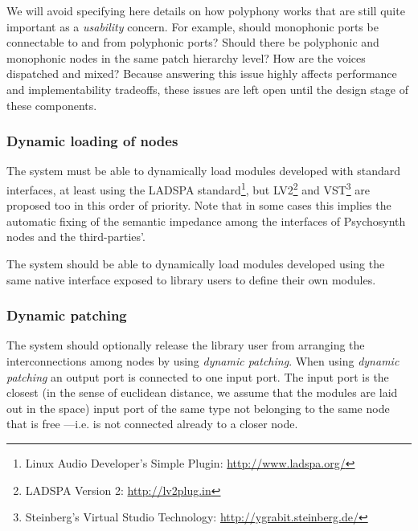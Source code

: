 \begin{mynote}
We will avoid specifying here details on how polyphony works that are
still quite important as a \emph{usability} concern. For example,
should monophonic ports be connectable to and from polyphonic ports?
Should there be polyphonic and monophonic nodes in the same patch
hierarchy level? How are the voices dispatched and mixed? Because
answering this issue highly affects performance and implementability
tradeoffs, these issues are left open until the design stage of these
components.
\end{mynote}

\subsubsection{Dynamic loading of nodes}

\begin{requirement}
  \label{req:iter3-begin}
  The system must be able to dynamically load modules developed with
  standard interfaces, at least using the LADSPA
  standard\footnote{Linux Audio Developer's Simple Plugin:
    \url{http://www.ladspa.org/}}, but LV2\footnote{LADSPA Version 2:
    \url{http://lv2plug.in}} and VST\footnote{Steinberg's Virtual
    Studio Technology: \url{http://ygrabit.steinberg.de/}} are
  proposed too in this order of priority. Note that in some cases this
  implies the automatic fixing of the semantic impedance among the
  interfaces of Psychosynth nodes and the third-parties'.
\end{requirement}

\begin{requirement}
  The system should be able to dynamically load modules developed
  using the same native interface exposed to library users to define
  their own modules. 
\end{requirement}

\subsubsection{Dynamic patching}

\begin{requirement}
  The system should optionally release the library user from arranging
  the interconnections among nodes by using \emph{dynamic
    patching}. When using \emph{dynamic patching} an output port is
  connected to one input port. The input port is the closest (in the
  sense of euclidean distance, we assume that the modules are laid out
  in the space) input port of the same type not belonging to the same
  node that is free ---i.e. is not connected already to a closer node.
\end{requirement}


